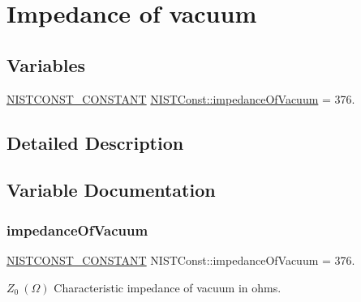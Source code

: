 \hypertarget{group___n_i_s_t_const-_impedance_of_vacuum}{}\section{Impedance of vacuum}
\label{group___n_i_s_t_const-_impedance_of_vacuum}
\subsection*{Variables}
\begin{DoxyCompactItemize}
\item 
\mbox{\hyperlink{_n_i_s_t_const_8hpp_a2b0fc1d7452373f816175dd86ce26729}{N\+I\+S\+T\+C\+O\+N\+S\+T\+\_\+\+C\+O\+N\+S\+T\+A\+NT}} \mbox{\hyperlink{group___n_i_s_t_const-_impedance_of_vacuum_gaed60576e7b6ccd87ca6204e09efd98ee}{N\+I\+S\+T\+Const\+::impedance\+Of\+Vacuum}} = 376.
\end{DoxyCompactItemize}


\subsection{Detailed Description}


\subsection{Variable Documentation}
\mbox{\label{group___n_i_s_t_const-_impedance_of_vacuum_gaed60576e7b6ccd87ca6204e09efd98ee}} 
\subsubsection{\texorpdfstring{impedance\+Of\+Vacuum}{impedanceOfVacuum}}
{\footnotesize\ttfamily \mbox{\hyperlink{_n_i_s_t_const_8hpp_a2b0fc1d7452373f816175dd86ce26729}{N\+I\+S\+T\+C\+O\+N\+S\+T\+\_\+\+C\+O\+N\+S\+T\+A\+NT}} N\+I\+S\+T\+Const\+::impedance\+Of\+Vacuum = 376.}

$Z_0 \ (\Omega)$ Characteristic impedance of vacuum in ohms. 